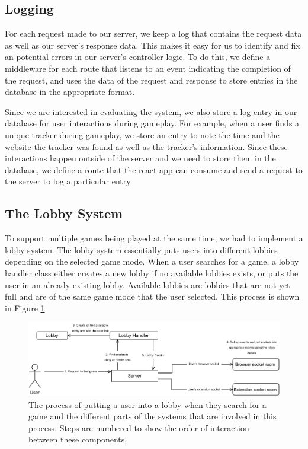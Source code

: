 \documentclass{l4proj}
\begin{document}
\subsection{Logging}
For each request made to our server, we keep a log that contains the request data as well as our server's response data. This makes it easy for us to identify and fix an potential errors in our server's controller logic. To do this, we define a middleware for each route that listens to an event indicating the completion of the request, and uses the data of the request and response to store entries in the database in the appropriate format.

Since we are interested in evaluating the system, we also store a log entry in our database for user interactions during gameplay. For example, when a user finds a unique tracker during gameplay, we store an entry to note the time and the website the tracker was found as well as the tracker's information. Since these interactions happen outside of the server and we need to store them in the database, we define a route that the react app can consume and send a request to the server to log a particular entry.

\subsection{The Lobby System}
To support multiple games being played at the same time, we had to implement a lobby system. The lobby system essentially puts users into different lobbies depending on the selected game mode. When a user searches for a game, a lobby handler class either creates a new lobby if no available lobbies exists, or puts the user in an already existing lobby. Available lobbies are lobbies that are not yet full and are of the same game mode that the user selected. This process is shown in Figure \ref{fig:lobby}.

\begin{figure}
    \centering
    \includegraphics[width=1\linewidth]{images/lobby.pdf}    

    \caption{The process of putting a user into a lobby when they search for a game and the different parts of the systems that are involved in this process. Steps are numbered to show the order of interaction between these components.}

    \label{fig:lobby} 
\end{figure}
\end{document}
